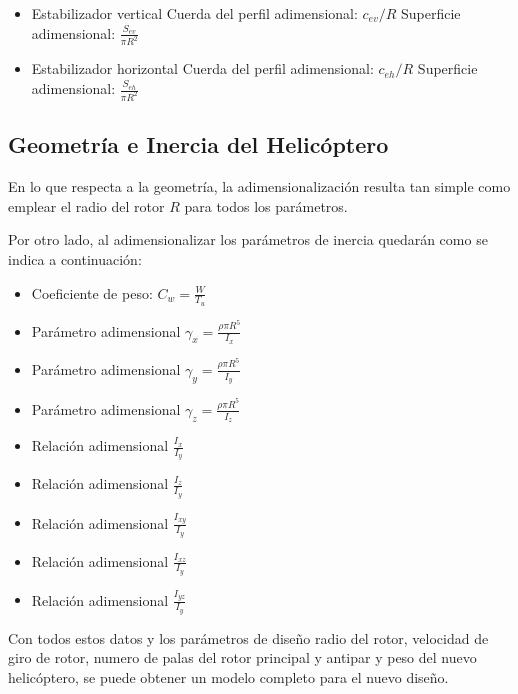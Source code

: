 \begin{multicols}{2}
	\begin{itemize}
		\item Estabilizador vertical
		\subitem Cuerda del perfil adimensional: $c_{ev}/R$
		\subitem Superficie adimensional: $\frac{S_{ev}}{\pi R^2}$
		\item Estabilizador horizontal
		\subitem Cuerda del perfil adimensional: $c_{eh}/R$
		\subitem Superficie adimensional: $\frac{S_{eh}}{\pi R^2}$
	\end{itemize}
\end{multicols}

\subsection{Geometría e Inercia del Helicóptero}

En lo que respecta a la geometría, la adimensionalización resulta tan simple como emplear el radio del rotor $R$ para todos los parámetros.

Por otro lado, al adimensionalizar los parámetros de inercia quedarán como se indica a continuación:

\begin{multicols}{2}
	\begin{itemize}
		\item Coeficiente de peso: $C_w=\frac{W}{T_u}$
		\item Parámetro adimensional $\gamma_x=\frac{\rho\pi R^5}{I_x}$
		\item Parámetro adimensional $\gamma_y=\frac{\rho\pi R^5}{I_y}$
		\item Parámetro adimensional $\gamma_z=\frac{\rho\pi R^5}{I_z}$
		\item Relación adimensional $\frac{I_x}{I_y}$
		\item Relación adimensional $\frac{I_z}{I_y}$
		\item Relación adimensional $\frac{I_{xy}}{I_y}$
		\item Relación adimensional $\frac{I_{xz}}{I_y}$
		\item Relación adimensional $\frac{I_{yz}}{I_y}$
	\end{itemize}
\end{multicols}

Con todos estos datos y los parámetros de diseño radio del rotor, velocidad de giro de rotor, numero de palas del rotor principal y antipar y peso del nuevo helicóptero, se puede obtener un modelo completo para el nuevo diseño.

